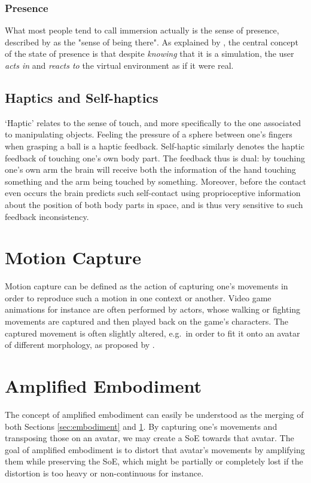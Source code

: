\subsubsection{Presence}
What most people tend to call immersion actually is the sense of presence, described by \cite{held1992telepresence,slater1993representations} as the "sense of being there". As explained by \cite{debarba2017embodiment}, the central concept of the state of presence is that despite \textit{knowing} that it is a simulation, the user \textit{acts in} and \textit{reacts to} the virtual environment as if it were real.

\subsection{Haptics and Self-haptics}

`Haptic' relates to the sense of touch, and more specifically to the one associated to manipulating objects. Feeling the pressure of a sphere between one's fingers when grasping a ball is a haptic feedback. Self-haptic similarly denotes the haptic feedback of touching one's own body part. The feedback thus is dual: by touching one's own arm the brain will receive both the information of the hand touching something and the arm being touched by something. Moreover, before the contact even occurs the brain predicts such self-contact using proprioceptive information about the position of both body parts in space, and is thus very sensitive to such feedback inconsistency.

\section{Motion Capture}
\label{sec:mocap}
Motion capture can be defined as the action of capturing one's movements in order to reproduce such a motion in one context or another. Video game animations for instance are often performed by actors, whose walking or fighting movements are captured and then played back on the game's characters. The captured movement is often slightly altered, e.g.\ in order to fit it onto an avatar of different morphology, as proposed by \cite{molla2017egocentric}.

\section{Amplified Embodiment}

The concept of amplified embodiment can easily be understood as the merging of both Sections \ref{sec:embodiment} and \ref{sec:mocap}. By capturing one's movements and transposing those on an avatar, we may create a SoE towards that avatar. The goal of amplified embodiment is to distort that avatar's movements by amplifying them while preserving the SoE, which might be partially or completely lost if the distortion is too heavy or non-continuous for instance.

